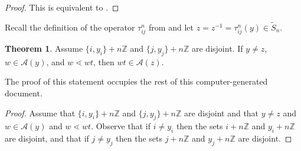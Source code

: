 \documentclass[10pt]{article}
\theoremstyle{definition}
\newtheorem*{theorem}{Theorem}
\theoremstyle{definition}
\def\ZZ{\mathbb{Z}}
\begin{document}
\begin{proof}
This is equivalent to \cite[Proposition 8.3.6]{BB}.
\end{proof}

Recall the definition of the operator $\tau^n_{ij}$ from \cite[\S8]{M} and
let $z = z^{-1} = \tau^n_{ij}(y) \in \tilde S_n$.

\begin{theorem}
Assume $\{i, y_i\} + n \ZZ$ and $\{j,y_j\} + n \ZZ$ are disjoint.
If $y \neq z$, $w \in \mathcal{A}(y)$, and $w\lessdot wt$, then $wt \in \mathcal{A}(z)$.
\end{theorem}

The proof of this statement occupies the rest of this computer-generated document.
\begin{proof}
Assume that  $\{i, y_i\} + n \ZZ$ and $\{j,y_j\} + n \ZZ$ are disjoint
and that $y \neq z$ and $w \in \mathcal{A}(y)$ and $w\lessdot wt$.
Observe that if $i \neq y_i$ then the sets $i + n\ZZ$ and $y_i + n \ZZ$ are disjoint,
and that if $j \neq y_j$ then the sets $j + n\ZZ$ and $y_j + n\ZZ$ are disjoint.


\end{proof}
\end{document}
